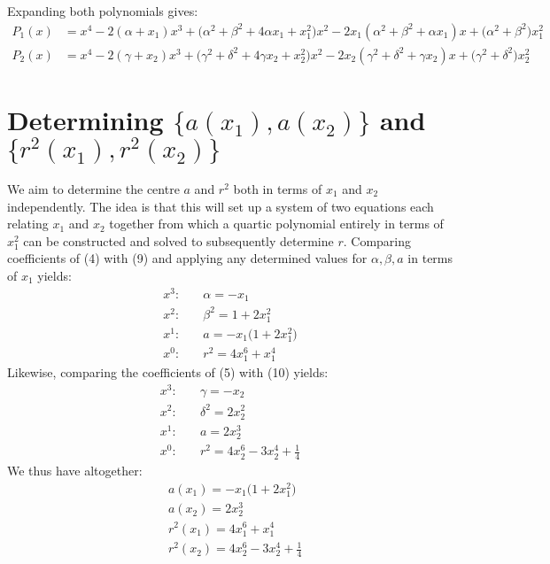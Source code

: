 \documentclass{article}
\begin{document}
Expanding both polynomials gives:
\begin{align*}
\tag{9}P_1(x) &= x^4 - 2(\alpha + x_1)x^3 + \big(\alpha^2 + \beta^2 + 4\alpha x_1 + x_1^2\big)x^2- 2x_1(\alpha^2 + \beta^2 + \alpha x_1)x + \big(\alpha^2 + \beta^2\big)x_1^2 \\
\tag{10}P_2(x) &= x^4 - 2(\gamma + x_2)x^3 + \big(\gamma^2 + \delta^2 + 4\gamma x_2 + x_2^2\big)x^2 - 2x_2(\gamma^2 + \delta^2 + \gamma x_2)x + \big(\gamma^2 + \delta^2\big)x_2^2
\end{align*}
\section{Determining $\{a(x_1),a(x_2)\}$ and $\{r^2(x_1),r^2(x_2)\}$}
We aim to determine the centre $a$ and $r^2$ both in terms of $x_1$ and $x_2$ independently. The idea is that this will set up a system of two equations each relating $x_1$ and $x_2$ together from which a quartic polynomial entirely in terms of $x_1^2$ can be constructed and solved to subsequently determine $r$.  
\newline\newline
Comparing coefficients of (4) with (9) and applying any determined values for $\alpha,\beta,a$ in terms of $x_1$ yields:
\begin{align*}
x^3\!:\!&\quad \alpha = -x_1 \\
x^2\!:\!&\quad \beta^2 = 1 + 2x_1^2 \\
x^1\!:\!&\quad a = -x_1\big(1 + 2x_1^2\big) \\
x^0\!:\!&\quad r^2=4x_1^6+x_1^4
\end{align*}
\noindent Likewise, comparing the coefficients of (5) with (10) yields:
\begin{align*}
x^3\!:\!&\quad \gamma =-x_2 \\
x^2\!:\!&\quad \delta^2=2x_2^2 \\
x^1\!:\!&\quad a = 2x_2^3 \\
x^0\!:\!&\quad r^2=4x_2^6-3x_2^4+\frac{1}{4}
\end{align*}
We thus have altogether:
\begin{align*}
    \tag{11} &a(x_1) =-x_1\big(1+2x_1^2\big) \\
    \tag{12} &a(x_2) = 2x_2^3 \\
    \tag{13} &r^2(x_1)=4x_1^6+x_1^4 \\
    \tag{14}&r^2(x_2)=4x_2^6-3x_2^4+\frac{1}{4}
\end{align*}
\end{document}
